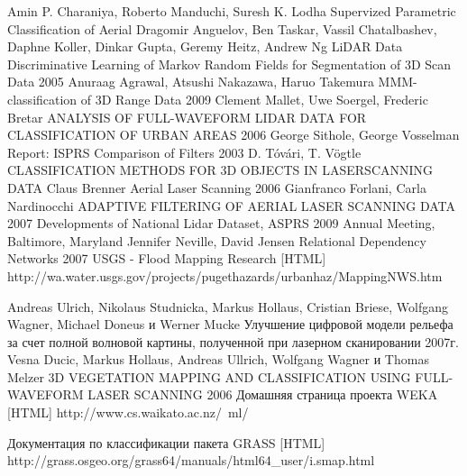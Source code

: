 \newpage
\begin{thebibliography}{99}
Amin P. Charaniya, Roberto Manduchi, Suresh K. Lodha Supervized Parametric Classification of Aerial 
Dragomir Anguelov, Ben Taskar, Vassil Chatalbashev, Daphne Koller, Dinkar Gupta, Geremy Heitz, Andrew Ng LiDAR Data Discriminative Learning of Markov Random Fields for Segmentation of 3D Scan Data 2005
Anuraag Agrawal, Atsushi Nakazawa, Haruo Takemura MMM-classification of 3D Range Data 2009
Clement Mallet, Uwe Soergel, Frederic Bretar ANALYSIS OF FULL-WAVEFORM LIDAR DATA FOR CLASSIFICATION OF URBAN AREAS 2006
George Sithole, George Vosselman Report: ISPRS Comparison of Filters 2003
D. Tóvári, T. Vögtle CLASSIFICATION METHODS FOR 3D OBJECTS IN LASERSCANNING DATA
Claus Brenner Aerial Laser Scanning 2006
Gianfranco Forlani, Carla Nardinocchi ADAPTIVE FILTERING OF AERIAL LASER SCANNING DATA 2007
Developments of National Lidar Dataset, ASPRS 2009 Annual Meeting, Baltimore, Maryland
 Jennifer Neville, David Jensen Relational Dependency Networks 2007
 USGS - Flood Mapping Research [HTML] http://wa.water.usgs.gov/projects/pugethazards/urbanhaz/MappingNWS.htm

Andreas Ulrich, Nikolaus Studnicka, Markus Hollaus, Cristian Briese, Wolfgang Wagner, Michael Doneus и Werner Mucke Улучшение цифровой модели рельефа за счет полной волновой картины, полученной при лазерном сканировании 2007г.
Vesna Ducic, Markus Hollaus, Andreas Ullrich, Wolfgang Wagner и Thomas Melzer 3D VEGETATION MAPPING AND CLASSIFICATION USING FULL-WAVEFORM LASER SCANNING 2006
Домашняя страница проекта WEKA [HTML] http://www.cs.waikato.ac.nz/~ml/

Документация по классификации пакета GRASS [HTML] http://grass.osgeo.org/grass64/manuals/html64\_user/i.smap.html
\end{thebibliography}